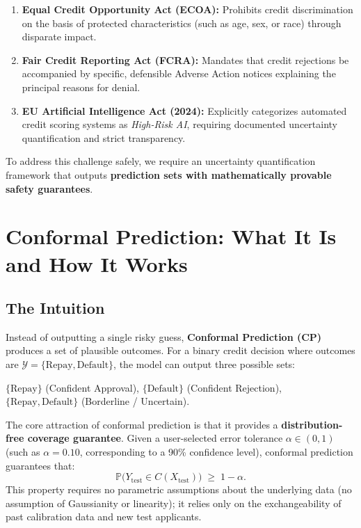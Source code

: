 \documentclass[11pt,a4paper]{article}
\begin{document}
\begin{enumerate}[leftmargin=1.5em, itemsep=2pt]
    \item \textbf{Equal Credit Opportunity Act (ECOA):} Prohibits credit discrimination on the basis of protected characteristics (such as age, sex, or race) through disparate impact.
    \item \textbf{Fair Credit Reporting Act (FCRA):} Mandates that credit rejections be accompanied by specific, defensible Adverse Action notices explaining the principal reasons for denial.
    \item \textbf{EU Artificial Intelligence Act (2024):} Explicitly categorizes automated credit scoring systems as \emph{High-Risk AI}, requiring documented uncertainty quantification and strict transparency.
\end{enumerate}

To address this challenge safely, we require an uncertainty quantification framework that outputs \textbf{prediction sets with mathematically provable safety guarantees}.

\section{Conformal Prediction: What It Is and How It Works}

\subsection{The Intuition}
Instead of outputting a single risky guess, \textbf{Conformal Prediction (CP)} produces a set of plausible outcomes. For a binary credit decision where outcomes are $\mathcal{Y} = \{\text{Repay}, \text{Default}\}$, the model can output three possible sets:
\begin{center}
    $\{\text{Repay}\}$ \quad (Confident Approval), \qquad $\{\text{Default}\}$ \quad (Confident Rejection), \qquad $\{\text{Repay}, \text{Default}\}$ \quad (Borderline / Uncertain).
\end{center}

The core attraction of conformal prediction is that it provides a \textbf{distribution-free coverage guarantee}. Given a user-selected error tolerance $\alpha \in (0, 1)$ (such as $\alpha = 0.10$, corresponding to a 90\% confidence level), conformal prediction guarantees that:
\begin{equation}
\mathbb{P}\bigl(Y_{\text{test}} \in C(X_{\text{test}})\bigr) \;\ge\; 1 - \alpha.
\end{equation}
This property requires no parametric assumptions about the underlying data (no assumption of Gaussianity or linearity); it relies only on the exchangeability of past calibration data and new test applicants.
\end{document}
